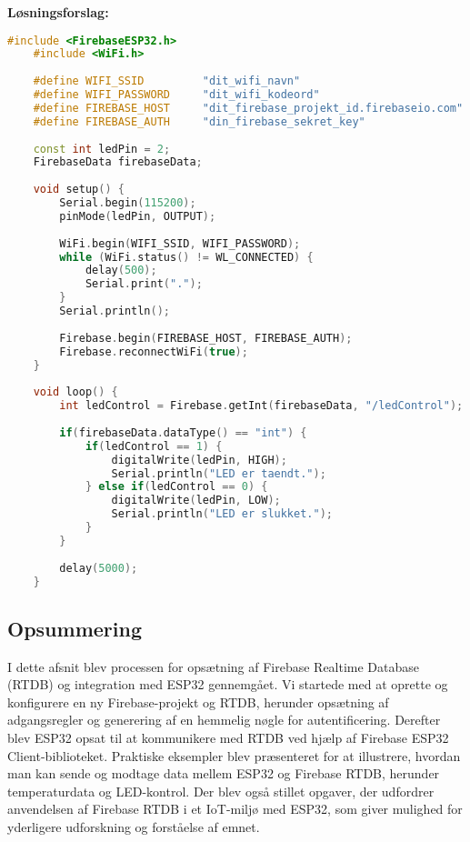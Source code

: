 \textbf{Løsningsforslag:}
\begin{lstlisting}[language=C++]
	#include <FirebaseESP32.h>
	#include <WiFi.h>
	
	#define WIFI_SSID         "dit_wifi_navn"
	#define WIFI_PASSWORD     "dit_wifi_kodeord"
	#define FIREBASE_HOST     "dit_firebase_projekt_id.firebaseio.com"
	#define FIREBASE_AUTH     "din_firebase_sekret_key"
	
	const int ledPin = 2;
	FirebaseData firebaseData;
	
	void setup() {
		Serial.begin(115200);
		pinMode(ledPin, OUTPUT);
		
		WiFi.begin(WIFI_SSID, WIFI_PASSWORD);
		while (WiFi.status() != WL_CONNECTED) {
			delay(500);
			Serial.print(".");
		}
		Serial.println();
		
		Firebase.begin(FIREBASE_HOST, FIREBASE_AUTH);
		Firebase.reconnectWiFi(true);
	}
	
	void loop() {
		int ledControl = Firebase.getInt(firebaseData, "/ledControl");
		
		if(firebaseData.dataType() == "int") {
			if(ledControl == 1) {
				digitalWrite(ledPin, HIGH);
				Serial.println("LED er taendt.");
			} else if(ledControl == 0) {
				digitalWrite(ledPin, LOW);
				Serial.println("LED er slukket.");
			}
		}
		
		delay(5000);
	}
\end{lstlisting}
\subsection*{Opsummering}
I dette afsnit blev processen for opsætning af Firebase Realtime Database (RTDB) og integration med ESP32 gennemgået. Vi startede med at oprette og konfigurere en ny Firebase-projekt og RTDB, herunder opsætning af adgangsregler og generering af en hemmelig nøgle for autentificering. Derefter blev ESP32 opsat til at kommunikere med RTDB ved hjælp af Firebase ESP32 Client-biblioteket. Praktiske eksempler blev præsenteret for at illustrere, hvordan man kan sende og modtage data mellem ESP32 og Firebase RTDB, herunder temperaturdata og LED-kontrol. Der blev også stillet opgaver, der udfordrer anvendelsen af Firebase RTDB i et IoT-miljø med ESP32, som giver mulighed for yderligere udforskning og forståelse af emnet.	
